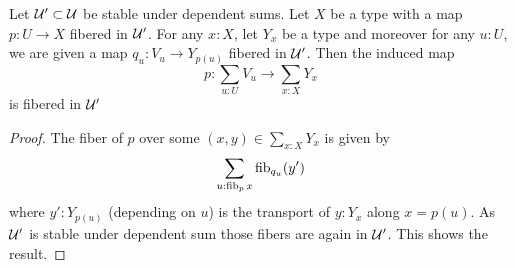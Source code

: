 \documentclass{article}
\begin{document}
\begin{lemma}{\label{lemma:AtlasSum}}
	Let $\mathcal{U}' \subset \mathcal{U}$ be stable under dependent sums.
	Let $X$ be a type with a  map $p : U \to X$ fibered in $\mathcal{U}'$.  For any $x : X$, let $Y_x$ be a type and moreover for any $u : U$, we are given a map $q_u : V_u \to Y_{p(u)}$ fibered in $\mathcal{U}'$. Then the induced map
	\[
	p : \sum_{u : U} V_u \to \sum_{x : X} Y_{x}
	\]
	is fibered in $\mathcal{U}'$
\end{lemma}
\begin{proof}
	The fiber of $p$ over some $(x,y) \in \sum_{x :X} Y_x$ is given by
	\[
	\sum_{u : \operatorname{fib}_p x} \operatorname{fib}_{q_u} (y') 
	\]
	where $y' : Y_{p(u)}$ (depending on $u$) is the transport of $y : Y_x$ along $x = p(u)$. As $\mathcal{U}'$ is stable under dependent sum %
	those fibers are again in $\mathcal{U}'$. This shows the result.
\end{proof}













\end{document}
